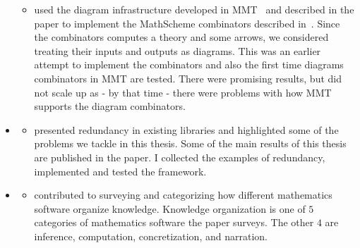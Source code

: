 \begin{itemize}
    \begin{itemize}
    \item[] used the diagram infrastructure developed in MMT~\cite{MMT} and described in the paper to implement the MathScheme combinators described in~\cite{carette2018building}. Since the combinators computes a theory and some arrows, we considered treating their inputs and outputs as diagrams.
This was an earlier attempt to implement the combinators and also the first time diagrams combinators in MMT are tested.  There were promising results, but did not scale up as - by that time - there were problems with how MMT supports the diagram combinators. 
    \end{itemize}        
    \item \cite{leverageCICM2020} 
    \begin{itemize}
    \item[]  presented redundancy in existing libraries and highlighted some of the problems we tackle in this thesis. Some of the main results of this thesis are published in the paper. I collected the examples of redundancy, implemented and tested the framework.
    \end{itemize} 
    \item \cite{bercic2020space} 
    \begin{itemize}
    \item[] contributed to surveying and categorizing how different mathematics software organize knowledge. Knowledge organization is one of $5$ categories of mathematics software the paper surveys. The other $4$ are inference, computation, concretization, and narration. 
    \end{itemize}        
\end{itemize}

